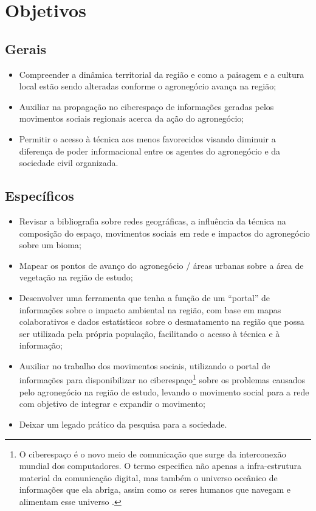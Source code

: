 \chapter{Objetivos}

\section{Gerais}

\begin{itemize}
 \item Compreender a dinâmica territorial da região e como a paisagem e a cultura local estão sendo alteradas conforme o agronegócio avança na região;
 \item Auxiliar na propagação no ciberespaço de informações geradas pelos movimentos sociais regionais acerca da ação do agronegócio;
 \item Permitir o acesso à técnica aos menos favorecidos visando diminuir a diferença de poder informacional entre os agentes do agronegócio e da sociedade civil organizada.
\end{itemize}

\section{Específicos}

\begin{itemize}
 \item Revisar a bibliografia sobre redes geográficas, a influência da técnica na composição do espaço, movimentos sociais em rede e impactos do agronegócio sobre um bioma;
 \item Mapear os pontos de avanço do agronegócio / áreas urbanas sobre a área de vegetação na região de estudo;
 \item Desenvolver uma ferramenta que tenha a função de um “portal” de informações sobre o impacto ambiental na região, com base em mapas colaborativos e dados estatísticos sobre o desmatamento na região que possa ser utilizada pela própria população, facilitando o acesso à técnica e à informação;
 \item Auxiliar no trabalho dos movimentos sociais, utilizando o portal de informações para disponibilizar no ciberespaço\footnote{O ciberespaço é o novo meio de comunicação que surge da interconexão mundial dos computadores. O termo especifica não apenas a infra-estrutura material da comunicação digital, mas também o universo oceânico de informações que ela abriga, assim como os seres humanos que navegam e alimentam esse universo \cite[p. 17]{levy}.} sobre os problemas causados pelo agronegócio na região de estudo, levando o movimento social para a rede com objetivo de integrar e expandir o movimento;
 \item Deixar um legado prático da pesquisa para a sociedade.
\end{itemize}

